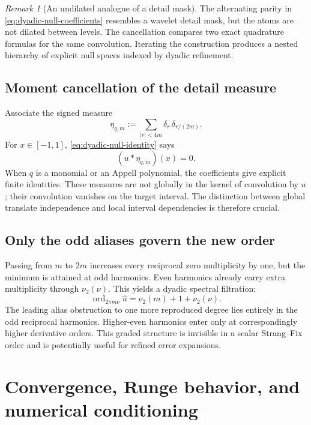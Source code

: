 \documentclass[11pt,oneside]{book}
\theoremstyle{definition}
\theoremstyle{remark}
\newtheorem{remark}[theorem]{Remark}
\DeclareMathOperator{\ord}{ord}
\newcommand{\vtwo}{\nu_2}
\begin{document}
\begin{remark}[An undilated analogue of a detail mask]
The alternating parity in \cref{eq:dyadic-null-coefficients} resembles a wavelet detail mask, but the atoms are not dilated between levels.  The cancellation compares two exact quadrature formulas for the same convolution.  Iterating the construction produces a nested hierarchy of explicit null spaces indexed by dyadic refinement.
\end{remark}

\section{Moment cancellation of the detail measure}
Associate the signed measure
\begin{equation}
 \eta_{q,m}:=\sum_{|r|<4m}\delta_r\,\delta_{r/(2m)}.
 \label{eq:detail-measure}
\end{equation}
For \(x\in[-1,1]\), \cref{eq:dyadic-null-identity} says
\begin{equation}
 (u*\eta_{q,m})(x)=0.
 \label{eq:convolution-null-measure}
\end{equation}
When \(q\) is a monomial or an Appell polynomial, the coefficients give explicit finite identities.  These measures are not globally in the kernel of convolution by \(u\); their convolution vanishes on the target interval.  The distinction between global translate independence and local interval dependencies is therefore crucial.

\section{Only the odd aliases govern the new order}
Passing from \(m\) to \(2m\) increases every reciprocal zero multiplicity by one, but the minimum is attained at odd harmonics.  Even harmonics already carry extra multiplicity through \(\vtwo(\nu)\).  This yields a dyadic spectral filtration:
\begin{equation}
 \ord_{2\pi m\nu}\widehat u
 =\vtwo(m)+1+\vtwo(\nu).
 \label{eq:spectral-filtration}
\end{equation}
The leading alias obstruction to one more reproduced degree lies entirely in the odd reciprocal harmonics.  Higher-even harmonics enter only at correspondingly higher derivative orders.  This graded structure is invisible in a scalar Strang--Fix order and is potentially useful for refined error expansions.

\chapter{Convergence, Runge behavior, and numerical conditioning}
\label{ch:convergence}
\end{document}
